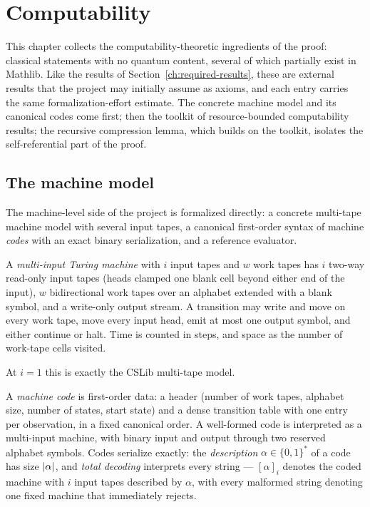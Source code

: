 \section{Computability}
\label{ch:computability}

This chapter collects the computability-theoretic ingredients of the proof: classical
statements with no quantum content, several of which partially exist in Mathlib. Like
the results of Section~\ref{ch:required-results}, these are external results that the
project may initially assume as axioms, and each entry carries the same
formalization-effort estimate. The concrete machine model and its canonical codes come
first; then the toolkit of resource-bounded computability results; the recursive
compression lemma, which builds on the toolkit, isolates the self-referential part of
the proof.

\subsection{The machine model}
\label{sec:machine-model}

The machine-level side of the project is formalized directly: a concrete multi-tape
machine model with several input tapes, a canonical first-order syntax of machine
\emph{codes} with an exact binary serialization, and a reference evaluator. 

\begin{definition}
\label{def:multiinput-tm}
\leanok
A \emph{multi-input Turing machine} with $i$ input tapes and $w$ work tapes has $i$
two-way read-only input tapes (heads clamped one blank cell beyond either end of the
input), $w$ bidirectional work tapes over an alphabet extended with a blank symbol, and
a write-only output stream. A transition may write and move on every work tape, move
every input head, emit at most one output symbol, and either continue or halt. Time is
counted in steps, and space as the number of work-tape cells visited. 

At $i = 1$ this
is exactly the CSLib multi-tape model.
\end{definition}

\begin{definition}
\label{def:machine-code}
\leanok
A \emph{machine code} is first-order data: a header (number of work tapes, alphabet
size, number of states, start state) and a dense transition table with one entry per
observation, in a fixed canonical order. A well-formed code is interpreted as a
multi-input machine, with binary input and output through two reserved alphabet
symbols. Codes serialize exactly: the \emph{description} $\alpha \in \{0,1\}^*$ of a
code has size $\left\vert {\alpha} \right\vert$, and \emph{total decoding} interprets every string ---
$[\alpha]_i$ denotes the coded machine with $i$ input tapes described by $\alpha$, with
every malformed string denoting one fixed machine that immediately rejects.
\end{definition}

